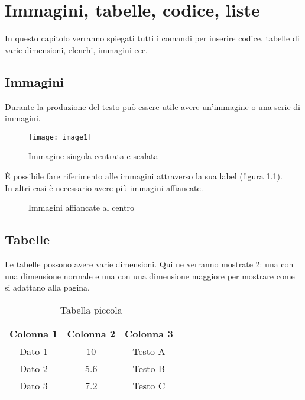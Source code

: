 \chapter{Immagini, tabelle, codice, liste}
In questo capitolo verranno spiegati tutti i comandi per inserire codice, tabelle di varie dimensioni, elenchi, immagini ecc.


\section{Immagini}
Durante la produzione del testo può essere utile avere un'immagine o una serie di immagini.

\begin{figure}[H]
	\centering
	\texttt{[image: image1]} %
	\caption{Immagine singola centrata e scalata}
	\label{capitolo2:image1}
\end{figure}

È possibile fare riferimento alle immagini attraverso la sua label (figura \ref{capitolo2:image1}).\\   %
In altri casi è necessario avere più immagini affiancate.

\begin{figure}[H]
    \centering
    \hfill
    \hfill
    \hfill
    \caption{Immagini affiancate al centro}
    \label{capitolo2:immaginiAffiancate}
\end{figure}


\section{Tabelle}
Le tabelle possono avere varie dimensioni. Qui ne verranno mostrate 2: una con una dimensione normale e una con una dimensione maggiore per mostrare come si adattano alla pagina.
\begin{table}[h!]
    \centering
    \begin{tabular}{|c|c|c|}
        \hline
        \textbf{Colonna 1} & \textbf{Colonna 2} & \textbf{Colonna 3} \\
        \hline
        Dato 1 & 10 & Testo A \\
        \hline
        Dato 2 & 5.6 & Testo B \\
        \hline
        Dato 3 & 7.2 & Testo C \\
        \hline
    \end{tabular}
    \caption{Tabella piccola}
	\label{capitolo2:tabellaPiccola}
\end{table}

